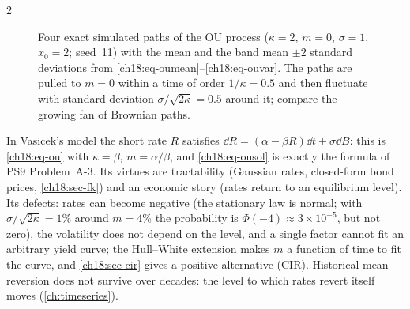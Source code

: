 \begin{paracol}{2}
\begin{figure}[ht]
\caption{Four exact simulated paths of the OU process ($\kappa=2$, $m=0$, $\sigma=1$, $x_0=2$; seed~11) with the mean and the band mean $\pm2$ standard deviations from \eqref{ch18:eq-oumean}--\eqref{ch18:eq-ouvar}. The paths are pulled to $m=0$ within a time of order $1/\kappa=0.5$ and then fluctuate with standard deviation $\sigma/\sqrt{2\kappa}=0.5$ around it; compare the growing fan of Brownian paths.}\label{ch18:fig-ou}
\end{figure}

\begin{finance}\label{ch18:fin-vasicek}
In Vasicek's model the short rate $R$ satisfies $\dd R=(\alpha-\beta R)\dd t+\sigma\dd B$: this is \eqref{ch18:eq-ou} with $\kappa=\beta$, $m=\alpha/\beta$, and \eqref{ch18:eq-ousol} is exactly the formula of PS9 Problem~A-3. Its virtues are tractability (Gaussian rates, closed-form bond prices, \cref{ch18:sec-fk}) and an economic story (rates return to an equilibrium level). Its defects: rates can become negative (the stationary law is normal; with $\sigma/\sqrt{2\kappa}=1\%$ around $m=4\%$ the probability is $\Phi(-4)\approx3\times10^{-5}$, but not zero), the volatility does not depend on the level, and a single factor cannot fit an arbitrary yield curve; the Hull--White extension makes $m$ a function of time to fit the curve, and \cref{ch18:sec-cir} gives a positive alternative (CIR). Historical mean reversion does not survive over decades: the level to which rates revert itself moves (\cref{ch:timeseries}).
\end{finance}


\end{paracol}

